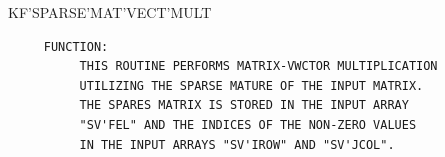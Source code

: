 \begin{frame}
KF'SPARSE'MAT'VECT'MULT
\begin{verbatim}
     FUNCTION:
          THIS ROUTINE PERFORMS MATRIX-VWCTOR MULTIPLICATION
          UTILIZING THE SPARSE MATURE OF THE INPUT MATRIX.
          THE SPARES MATRIX IS STORED IN THE INPUT ARRAY
          "SV'FEL" AND THE INDICES OF THE NON-ZERO VALUES
          IN THE INPUT ARRAYS "SV'IROW" AND "SV'JCOL".



\end{verbatim}
\end{frame}
